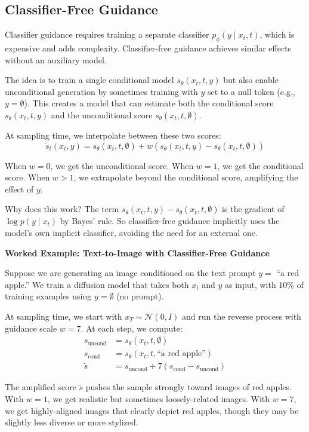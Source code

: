\vspSection

\subsection{Classifier-Free Guidance}

Classifier guidance requires training a separate classifier $p_\phi(y \mid x_t, t)$, which is expensive and adds complexity. Classifier-free guidance achieves similar effects without an auxiliary model.

\vspPara

The idea is to train a single conditional model $s_\theta(x_t, t, y)$ but also enable unconditional generation by sometimes training with $y$ set to a null token (e.g., $y = \emptyset$). This creates a model that can estimate both the conditional score $s_\theta(x_t, t, y)$ and the unconditional score $s_\theta(x_t, t, \emptyset)$.

\vspPara

At sampling time, we interpolate between these two scores:
%
\begin{equation}
\tilde{s}_t(x_t, y) = s_\theta(x_t, t, \emptyset) + w \left( s_\theta(x_t, t, y) - s_\theta(x_t, t, \emptyset) \right)
\end{equation}

\vspPara

When $w = 0$, we get the unconditional score. When $w = 1$, we get the conditional score. When $w > 1$, we extrapolate beyond the conditional score, amplifying the effect of $y$.

\vspPara

Why does this work? The term $s_\theta(x_t, t, y) - s_\theta(x_t, t, \emptyset)$ is the gradient of $\log p(y \mid x_t)$ by Bayes' rule. So classifier-free guidance implicitly uses the model's own implicit classifier, avoiding the need for an external one.

\vspSection

\begin{examplebox}
\textbf{Worked Example: Text-to-Image with Classifier-Free Guidance}

Suppose we are generating an image conditioned on the text prompt $y = $ ``a red apple.'' We train a diffusion model that takes both $x_t$ and $y$ as input, with 10\% of training examples using $y = \emptyset$ (no prompt).

At sampling time, we start with $x_T \sim \mathcal{N}(0, I)$ and run the reverse process with guidance scale $w = 7$. At each step, we compute:
%
\begin{align*}
s_{\text{uncond}} &= s_\theta(x_t, t, \emptyset) \\
s_{\text{cond}} &= s_\theta(x_t, t, \text{``a red apple''}) \\
\tilde{s} &= s_{\text{uncond}} + 7 (s_{\text{cond}} - s_{\text{uncond}})
\end{align*}

The amplified score $\tilde{s}$ pushes the sample strongly toward images of red apples. With $w = 1$, we get realistic but sometimes loosely-related images. With $w = 7$, we get highly-aligned images that clearly depict red apples, though they may be slightly less diverse or more stylized.
\end{examplebox}

